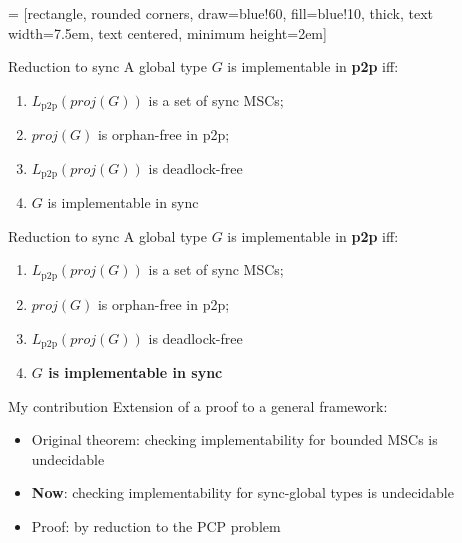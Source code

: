 \documentclass{beamer}
\begin{document}
 = [rectangle, rounded corners, draw=blue!60, fill=blue!10, thick,
text width=7.5em, text centered, minimum height=2em]



\begin{frame}{Reduction to sync}
	A global type $G$ is implementable in \textbf{p2p} iff:
	\begin{enumerate}
		\item $L_{\text{p2p}}(proj(G))$ is a set of sync MSCs;
		\item $proj(G)$ is orphan-free in p2p; %
		\item $L_{\text{p2p}}(proj(G))$ is deadlock-free
		\item $G$ is implementable in sync
	\end{enumerate}
\end{frame}

\begin{frame}{Reduction to sync}
	A global type $G$ is implementable in \textbf{p2p} iff:
	\begin{enumerate}
		\item $L_{\text{p2p}}(proj(G))$ is a set of sync MSCs;
		\item $proj(G)$ is orphan-free in p2p; %
		\item $L_{\text{p2p}}(proj(G))$ is deadlock-free
		\item \textbf{$G$ is implementable in sync} \scalebox{1.5}{{\color{red}$\longleftarrow$}}
	\end{enumerate}
\end{frame}

\begin{frame}{My contribution}
	Extension of a proof to a general framework:

	\bigskip

	\begin{itemize}
		\item Original theorem: checking implementability for bounded
		      MSCs is undecidable

		      \bigskip

		\item \textbf{Now}: checking implementability for sync-global
		      types is undecidable

		      \bigskip

		\item Proof: by reduction to the PCP problem
	\end{itemize}
\end{frame}
\end{document}
